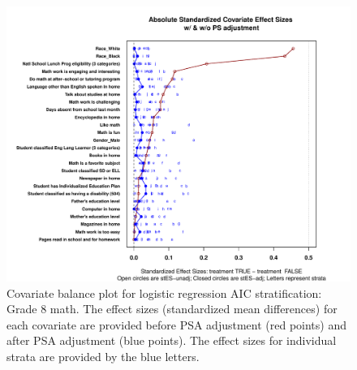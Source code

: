 \begin{figure}
\begin{center}
\includegraphics[width=\textwidth]{../Figures2009/g8math-lrAIC-balance.pdf}
\caption[Covariate balance plot for logistic regression AIC stratification: Grade 8 math]{Covariate balance plot for logistic regression AIC stratification: Grade 8 math. The effect sizes (standardized mean differences) for each covariate are provided before PSA adjustment (red points) and after PSA adjustment (blue points). The effect sizes for individual strata are provided by the blue letters.}
\end{center}
\end{figure}

